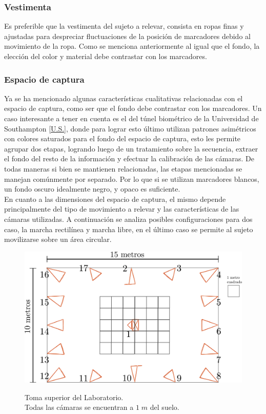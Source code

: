 \subsubsection{Vestimenta}
Es preferible que la vestimenta del sujeto a relevar, consista en ropas finas y ajustadas para despreciar fluctuaciones de la posición de marcadores debido al movimiento de la ropa. Como se menciona anteriormente al igual que el fondo, la elección del color y material debe contrastar con los marcadores.

\subsubsection{Espacio de captura}

Ya se ha mencionado algunas características cualitativas relacionadas con el espacio de captura, como ser que el fondo debe contrastar con los marcadores. Un caso interesante a tener en cuenta es el del túnel biométrico de la Universidad de Southampton \ref{U.S.}, donde para lograr esto último utilizan patrones asimétricos con colores saturados para el fondo del espacio de captura, esto les permite agrupar dos etapas, logrando luego de un tratamiento sobre la secuencia, extraer el fondo del resto de la información y efectuar la calibración de las cámaras. De todas maneras si bien se mantienen relacionadas, las etapas mencionadas se manejan comúnmente por separado. Por lo que si se utilizan marcadores blancos, un fondo oscuro idealmente negro, y opaco es suficiente.\\

En cuanto a las dimensiones del espacio de captura, el mismo depende principalmente del tipo de movimiento a relevar y las características de las cámaras utilizadas. A continuación se analiza posibles configuraciones para dos caso, la marcha rectilínea y marcha libre, en el último caso se permite al sujeto movilizarse sobre un área circular.


\begin{figure}[H]
  \centering
  {\includegraphics[scale=0.2]{img/Base_Datos/Laboratorio.pdf}\label{img_Laboratorio}}      
  \caption{Toma superior del Laboratorio.\\ Todas las cámaras se encuentran a $1\;m$ del suelo.}
  \label{img_estimacion_resolucion}
\end{figure}  
 

